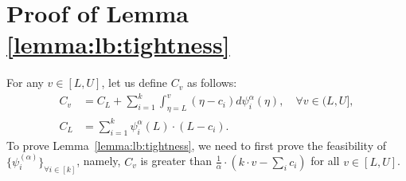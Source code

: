 \section{Proof of Lemma \ref{lemma:lb:tightness}}
\label{appendix:lemma:lb:tightness}
For any $v \in [L,U]$, let us define $C_v$ as follows:
    \begin{align*}
        C_{v} &= C_{L} + \sum_{i=1}^{k} \int_{\eta =L}^{v} (\eta - c_{i} )d\psi^{\alpha}_{i}(\eta), \quad \forall v\in (L,U],\\
        C_{L} &= \sum_{i=1}^{k} \psi^{\alpha}_{i}(L) \cdot (L - c_{i}).
    \end{align*}
To prove Lemma~\ref{lemma:lb:tightness}, we need to first  prove the feasibility of ${\{\psi^{(\alpha)}_{i}\}}_{\forall i \in [k]}$, namely, $C_{v}$ is greater than $\frac{1}{\alpha} \cdot (k \cdot v - \sum_{i} c_{i})$ for all $v  \in [L,U]$. 
     
